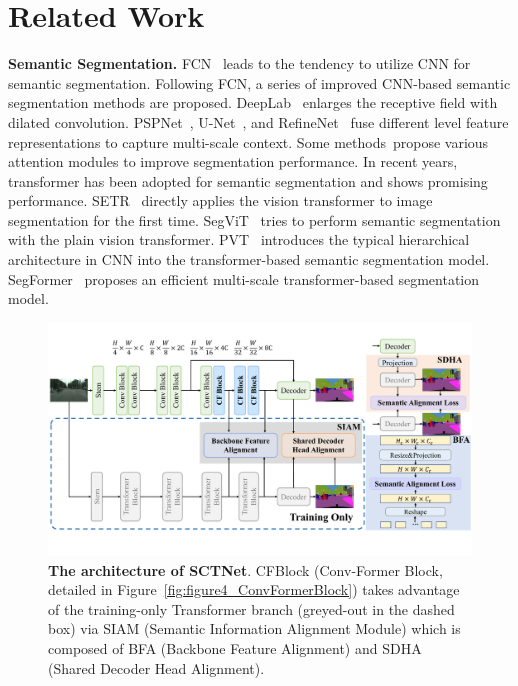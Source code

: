 \documentclass[letterpaper]{article} %
\begin{document}
\section{Related Work}
\textbf{Semantic Segmentation.}
FCN~\cite{long2015fully} leads to the tendency to utilize CNN for semantic segmentation. Following FCN, a series of improved CNN-based semantic segmentation methods are proposed. DeepLab~\cite{chen2017deeplab} enlarges the receptive field with dilated convolution. PSPNet~\cite{zhao2017pyramid}, U-Net~\cite{ronneberger2015u}, and RefineNet~\cite{lin2017refinenet} fuse different level feature representations to capture multi-scale context. Some methods~\cite{fu2019dual,huang2019ccnet,yuan2018ocnet,zhao2018psanet}propose various attention modules to improve segmentation performance. In recent years, transformer has been adopted for semantic segmentation and shows promising performance. SETR~\cite{zheng2021rethinking} directly applies the vision transformer to image segmentation for the first time. SegViT~\cite{zhang2022segvit} tries to perform semantic segmentation with the plain vision transformer. PVT~\cite{wang2021pyramid} introduces the typical hierarchical architecture in CNN into the transformer-based semantic segmentation model. SegFormer~\cite{xie2021segformer} proposes an efficient multi-scale transformer-based segmentation model.

\begin{figure}
\begin{center}
   \includegraphics[width=\linewidth]{image/figure3_overallarchitecture.pdf}
\end{center}
   \caption{\textbf{The architecture of SCTNet}. CFBlock (Conv-Former Block, detailed in Figure~\ref{fig:figure4_ConvFormerBlock}) takes advantage of the training-only Transformer branch (greyed-out in the dashed box) via SIAM (Semantic Information Alignment Module) which is composed of BFA (Backbone Feature Alignment) and SDHA (Shared Decoder Head Alignment).}
\label{fig:figure3_OverallArchitecture}
\end{figure}
\end{document}

